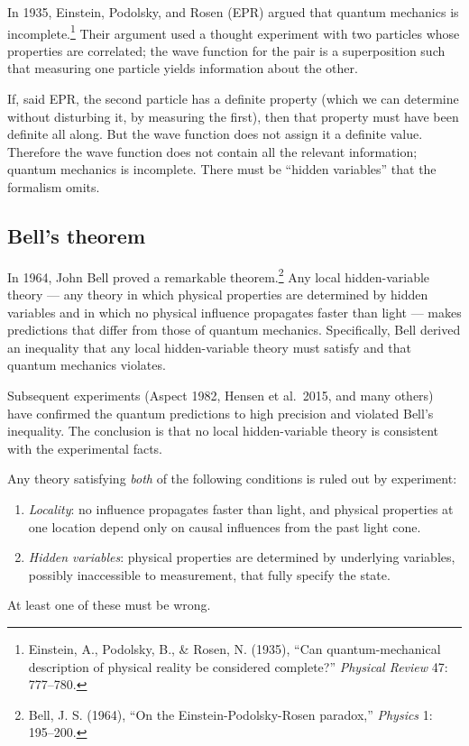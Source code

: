 In 1935, Einstein, Podolsky, and Rosen (EPR) argued that quantum
mechanics is incomplete.\footnote{Einstein, A., Podolsky, B., \&
Rosen, N. (1935), ``Can quantum-mechanical description of physical
reality be considered complete?'' \emph{Physical Review} 47:
777--780.} Their argument used a thought experiment with two
particles whose properties are correlated; the wave function for the
pair is a superposition such that measuring one particle yields
information about the other.

If, said EPR, the second particle has a definite property (which we
can determine without disturbing it, by measuring the first), then
that property must have been definite all along. But the wave
function does not assign it a definite value. Therefore the wave
function does not contain all the relevant information; quantum
mechanics is incomplete. There must be ``hidden variables'' that
the formalism omits.

\subsection{Bell's theorem}

In 1964, John Bell proved a remarkable theorem.\footnote{Bell, J. S.
(1964), ``On the Einstein-Podolsky-Rosen paradox,'' \emph{Physics}
1: 195--200.} Any local hidden-variable theory --- any theory in
which physical properties are determined by hidden variables and in
which no physical influence propagates faster than light --- makes
predictions that differ from those of quantum mechanics. Specifically,
Bell derived an inequality that any local hidden-variable theory must
satisfy and that quantum mechanics violates.

Subsequent experiments (Aspect 1982, Hensen et al.\ 2015, and many
others) have confirmed the quantum predictions to high precision and
violated Bell's inequality. The conclusion is that no local
hidden-variable theory is consistent with the experimental facts.

\begin{conceptbox}
\label{conc:bell}
Any theory satisfying \emph{both} of the following conditions is
ruled out by experiment:
\begin{enumerate}[leftmargin=1.5em]
    \item \emph{Locality}: no influence propagates faster than
    light, and physical properties at one location depend only on
    causal influences from the past light cone.
    \item \emph{Hidden variables}: physical properties are determined
    by underlying variables, possibly inaccessible to measurement,
    that fully specify the state.
\end{enumerate}
At least one of these must be wrong.
\end{conceptbox}


